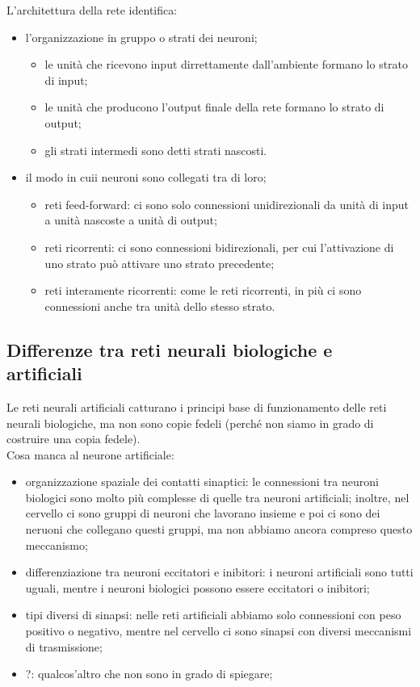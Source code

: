 L'architettura della rete identifica:
\begin{itemize}
\item l'organizzazione in gruppo o strati dei neuroni;
	\begin{itemize}
		\item le unità che ricevono input dirrettamente dall'ambiente formano lo strato
		di input;
		\item le unità che producono l'output finale della rete formano lo strato di
		output;
		\item gli strati intermedi sono detti strati nascosti.
	\end{itemize}
\item il modo in cuii neuroni sono collegati tra di loro;
	\begin{itemize}
		\item reti feed-forward: ci sono solo connessioni unidirezionali da unità di
		input a unità nascoste a unità di output;

		\item reti ricorrenti: ci sono connessioni bidirezionali, per cui
		l'attivazione di uno strato può attivare uno strato precedente;

		\item reti interamente ricorrenti: come le reti ricorrenti, in più ci
		sono connessioni anche tra unità dello stesso strato.
	\end{itemize}
\end{itemize}

\subsection{Differenze tra reti neurali biologiche e artificiali}

Le reti neurali artificiali catturano i principi base di funzionamento delle
reti neurali biologiche, ma non sono copie fedeli (perché non siamo in grado di
costruire una copia fedele).\\
Cosa manca al neurone artificiale:
\begin{itemize}
\item organizzazione spaziale dei contatti sinaptici: le connessioni tra neuroni
biologici sono molto più complesse di quelle tra neuroni artificiali; inoltre,
nel cervello ci sono gruppi di neuroni che lavorano insieme e poi ci sono dei
neruoni che collegano questi gruppi, ma non abbiamo ancora compreso questo
meccanismo;
\item differenziazione tra neuroni eccitatori e inibitori: i neuroni artificiali
sono tutti uguali, mentre i neuroni biologici possono essere eccitatori o
inibitori;
\item tipi diversi di sinapsi: nelle reti artificiali abbiamo solo connessioni
con peso positivo o negativo, mentre nel cervello ci sono sinapsi con diversi
meccanismi di trasmissione;
\item ?: qualcos'altro che non sono in grado di spiegare;
\end{itemize}

